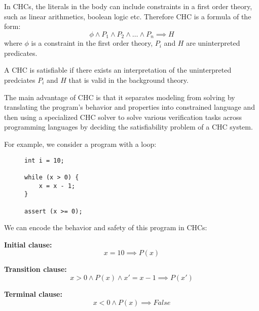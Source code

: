 \vspace{\baselineskip}
In CHCs, the literals in the body can include constraints in a first order theory, such as linear arithmetics, boolean logic etc.
Therefore CHC is a formula of the form:
\begin{equation}
    \phi \land P_{1} \land P_{2} \land \dots \land P_{n} \implies H
\end{equation}
where $\phi$ is a constraint in the first order theory, $P_i$ and $H$ are uninterpreted predicates. 

\vspace{\baselineskip}\noindent
A CHC is satisfiable if there exists an interpretation of the uninterpreted predciates $P_i$ and $H$ that is valid in the background theory.

The main advantage of CHC is that it separates modeling
from solving by translating the program’s behavior and properties into
constrained language and then using a specialized CHC solver to solve various
verification tasks across programming languages by deciding the satisfiability
problem of a CHC system.

\vspace{\baselineskip}\noindent
For example, we consider a program with a loop:

\vspace{\baselineskip}
\begin{figure}[h]
\begin{mdframed}
\begin{lstlisting}
int i = 10;

while (x > 0) {
    x = x - 1;
}

assert (x >= 0);
\end{lstlisting}
\end{mdframed}
\end{figure}

We can encode the behavior and safety of this program in CHCs:

\vspace{\baselineskip}
\textbf{Initial clause:}
\begin{equation}
    x = 10 \implies P(x)
\end{equation}

\vspace{\baselineskip}
\textbf{Transition clause:}
\begin{equation}
    x > 0 \land P(x) \land x' = x - 1 \implies P(x')
\end{equation}

\vspace{\baselineskip}
\textbf{Terminal clause:}
\begin{equation}
    x < 0 \land P(x) \implies False
\end{equation}

